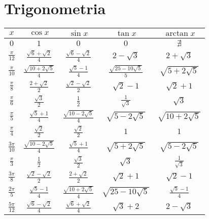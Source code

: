 \documentclass[a4paper,10pt]{article}
\theoremstyle{mystyle}
\begin{document}
\section{Trigonometria}
\begin{center}
    \begin{tabular}{c c c c c}
    \hline
    \( x \) & \( \cos x \) & \( \sin x \) & \( \tan x \) & \( \arctan x \) \\ %
    \hline
    \( 0 \)  & \( 1 \)  & \( 0 \)  & \( 0 \)  & \( \nexists \)  \\ %
    \( \frac{\pi}{12} \)  & \( \frac{\sqrt{6}+\sqrt{2}}{4} \)  & \( \frac{\sqrt{6}-\sqrt{2}}{4} \)   & \( 2-\sqrt{3} \)  & \( 2+\sqrt{3} \) \\ %
    \( \frac{\pi}{10} \) & \( \frac{\sqrt{10+2\sqrt{5}}}{4} \) & \( \frac{\sqrt{5}-1}{4} \) & \( \frac{\sqrt{25-10\sqrt{5}}}{5} \) & \( \sqrt{5+2\sqrt{5}} \) \\ %
    \( \frac{\pi}{8} \) & \( \frac{2+\sqrt{2}}{2} \) & \( \frac{\sqrt{2}-\sqrt{2}}{2} \) & \( \sqrt{2} -1 \) & \( \sqrt{2}+1 \) \\ %
    \( \frac{\pi}{6} \) & \( \frac{\sqrt{3}}{2} \) & \( \frac{1}{2} \) & \( \frac{1}{\sqrt{3}} \) & \( \sqrt{3} \) \\ %
    \( \frac{\pi}{5} \) & \( \frac{\sqrt{5}+1}{4} \) & \( \frac{\sqrt{10-2\sqrt{5}}}{4} \) & \( \sqrt{5-2\sqrt{5}} \) & \( \sqrt{10+2\sqrt{5}} \) \\ %
    \( \frac{\pi}{4} \) & \( \frac{\sqrt{2}}{2} \) & \( \frac{\sqrt{2}}{2} \) & \( 1 \) & \( 1 \) \\ %
    \( \frac{3\pi}{10} \) & \( \frac{\sqrt{10-2\sqrt{5}}}{4} \) & \( \frac{\sqrt{5}+1}{4} \) & \( \sqrt{5+2\sqrt{5}} \) & \( \sqrt{5-2\sqrt{5}} \) \\ %
    \( \frac{\pi}{3} \) & \( \frac{1}{2} \) & \( \frac{\sqrt{3}}{2} \) & \( \sqrt{3} \) & \( \frac{1}{\sqrt{3}} \) \\ %
    \( \frac{3\pi}{8} \) & \( \frac{\sqrt{2}-\sqrt{2}}{2} \) & \( \frac{2+\sqrt{2}}{2} \) & \( \sqrt{2}+1 \) & \( \sqrt{2}-1 \) \\ %
    \( \frac{2\pi}{5} \) & \( \frac{\sqrt{5}-1}{4} \) & \( \frac{\sqrt{10+2\sqrt{5}}}{4} \) & \( \sqrt{25-10\sqrt{5}} \) & \( \frac{\sqrt{5}-1}{4} \) \\ %
    \( \frac{5\pi}{12} \) & \( \frac{\sqrt{6}-\sqrt{2}}{4} \) & \( \frac{\sqrt{6}+\sqrt{2}}{4} \) & \( \sqrt{3}+2 \) & \( 2-\sqrt{3} \) \\ %

\end{tabular}
\end{center}
\end{document}

